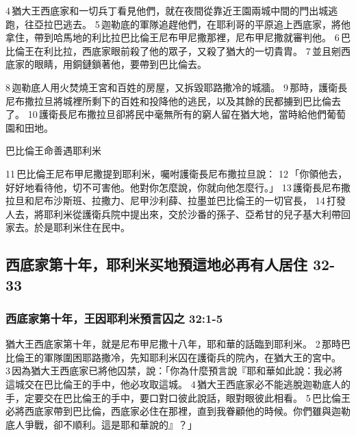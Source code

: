 4 猶大王西底家和一切兵丁看見他們，就在夜間從靠近王園兩城中間的門出城逃跑，往亞拉巴逃去。 5 迦勒底的軍隊追趕他們，在耶利哥的平原追上西底家，將他拿住，帶到哈馬地的利比拉巴比倫王尼布甲尼撒那裡，尼布甲尼撒就審判他。 6 巴比倫王在利比拉，西底家眼前殺了他的眾子，又殺了猶大的一切貴胄。 7 並且剜西底家的眼睛，用銅鏈鎖著他，要帶到巴比倫去。



8 迦勒底人用火焚燒王宮和百姓的房屋，又拆毀耶路撒冷的城牆。 9 那時，護衛長尼布撒拉旦將城裡所剩下的百姓和投降他的逃民，以及其餘的民都擄到巴比倫去了。 10 護衛長尼布撒拉旦卻將民中毫無所有的窮人留在猶大地，當時給他們葡萄園和田地。

巴比倫王命善遇耶利米

11 巴比倫王尼布甲尼撒提到耶利米，囑咐護衛長尼布撒拉旦說： 12 「你領他去，好好地看待他，切不可害他。他對你怎麼說，你就向他怎麼行。」 13 護衛長尼布撒拉旦和尼布沙斯班、拉撒力、尼甲沙利薛、拉墨並巴比倫王的一切官長， 14 打發人去，將耶利米從護衛兵院中提出來，交於沙番的孫子、亞希甘的兒子基大利帶回家去。於是耶利米住在民中。





\subsection{西底家第十年，耶利米买地預這地必再有人居住 32-33}
\subsubsection{西底家第十年，王因耶利米預言囚之 32:1-5}
猶大王西底家第十年，就是尼布甲尼撒十八年，耶和華的話臨到耶利米。 2 那時巴比倫王的軍隊圍困耶路撒冷，先知耶利米囚在護衛兵的院內，在猶大王的宮中。 3 因為猶大王西底家已將他囚禁，說：「你為什麼預言說『耶和華如此說：我必將這城交在巴比倫王的手中，他必攻取這城。 4 猶大王西底家必不能逃脫迦勒底人的手，定要交在巴比倫王的手中，要口對口彼此說話，眼對眼彼此相看。 5 巴比倫王必將西底家帶到巴比倫，西底家必住在那裡，直到我眷顧他的時候。你們雖與迦勒底人爭戰，卻不順利。這是耶和華說的』？」

